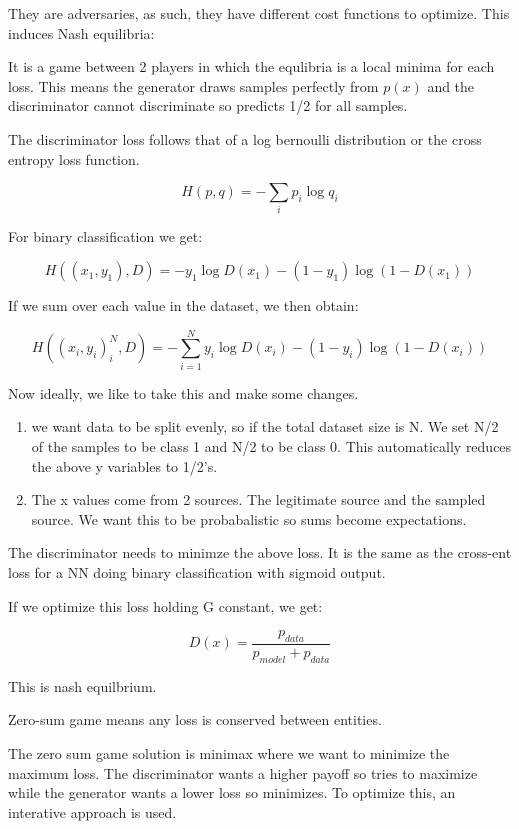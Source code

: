 \documentclass{article}
\begin{document}
They are adversaries, as such, they have different cost functions to optimize. This induces Nash equilibria:

It is a game between 2 players in which the equlibria is a local minima for each loss. This means the generator draws samples perfectly from $p(x)$ and the discriminator cannot discriminate so predicts 1/2 for all samples.

The discriminator loss follows that of a log bernoulli distribution or the cross entropy loss function.

$$ H(p,q) = -\sum_i p_i \log q_i$$

For binary classification we get:

$$ H((x_1,y_1),D) = -y_1 \log D(x_1) - (1-y_1) \log (1-D(x_1)) $$

If we sum over each value in the dataset, we then obtain:

$$ H((x_i,y_i)_i^N,D) = -\sum_{i=1}^N y_i \log D(x_i) - (1-y_i) \log (1-D(x_i)) $$


Now ideally, we like to take this and make some changes.

\begin{enumerate}
\item we want data to be split evenly, so if the total dataset size is N. We set N/2 of the samples to be class 1 and N/2 to be class 0. This automatically reduces the above y variables to 1/2's. 
\item The x values come from 2 sources. The legitimate source and the sampled source. We want this to be probabalistic so sums become expectations.
\end{enumerate}

%
%

The discriminator needs to minimze the above loss. It is the same as the cross-ent loss for a NN doing binary classification with sigmoid output.

If we optimize this loss holding G constant, we get:

$$ D(x) = \frac{p_{data}}{p_{model} + p_{data}} $$

This is nash equilbrium.

Zero-sum game means any loss is conserved between entities. 

The zero sum game solution is minimax where we want to minimize the maximum loss. The discriminator wants a higher payoff so tries to maximize while the generator wants a lower loss so minimizes. To optimize this, an interative approach is used.
\end{document}
